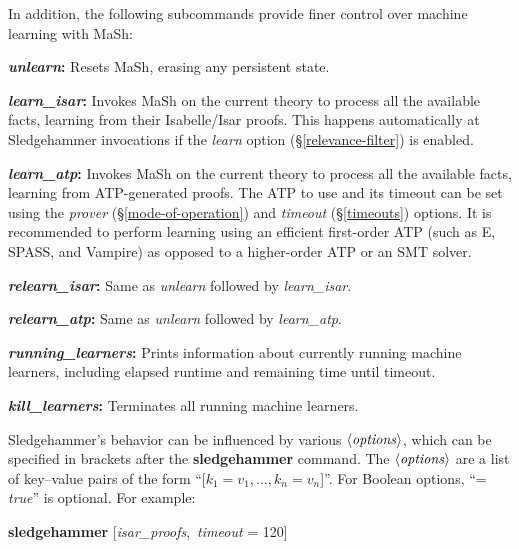 \documentclass[a4paper,12pt]{article}
\def\qty#1{\ensuremath{\left<\mathit{#1\/}\right>}}
\begin{document}
In addition, the following subcommands provide finer control over machine
learning with MaSh:

\begin{enum}
\item[\labelitemi] \textbf{\textit{unlearn}:} Resets MaSh, erasing any
persistent state.

\item[\labelitemi] \textbf{\textit{learn\_isar}:} Invokes MaSh on the current
theory to process all the available facts, learning from their Isabelle/Isar
proofs. This happens automatically at Sledgehammer invocations if the
\textit{learn} option (\S\ref{relevance-filter}) is enabled.

\item[\labelitemi] \textbf{\textit{learn\_atp}:} Invokes MaSh on the current
theory to process all the available facts, learning from ATP-generated proofs.
The ATP to use and its timeout can be set using the
\textit{prover} (\S\ref{mode-of-operation}) and \textit{timeout}
(\S\ref{timeouts}) options. It is recommended to perform learning using an
efficient first-order ATP (such as E, SPASS, and Vampire) as opposed to a
higher-order ATP or an SMT solver.

\item[\labelitemi] \textbf{\textit{relearn\_isar}:} Same as \textit{unlearn}
followed by \textit{learn\_isar}.

\item[\labelitemi] \textbf{\textit{relearn\_atp}:} Same as \textit{unlearn}
followed by \textit{learn\_atp}.

\item[\labelitemi] \textbf{\textit{running\_learners}:} Prints information about
currently running machine learners, including elapsed runtime and remaining
time until timeout.

\item[\labelitemi] \textbf{\textit{kill\_learners}:} Terminates all running
machine learners.
\end{enum}

Sledgehammer's behavior can be influenced by various \qty{options}, which can be
specified in brackets after the \textbf{sledgehammer} command. The
\qty{options} are a list of key--value pairs of the form ``[$k_1 = v_1,
\ldots, k_n = v_n$]''. For Boolean options, ``= \textit{true\/}'' is optional. For
example:

\prew
\textbf{sledgehammer} [\textit{isar\_proofs}, \,\textit{timeout} = 120]
\postw
\end{document}
